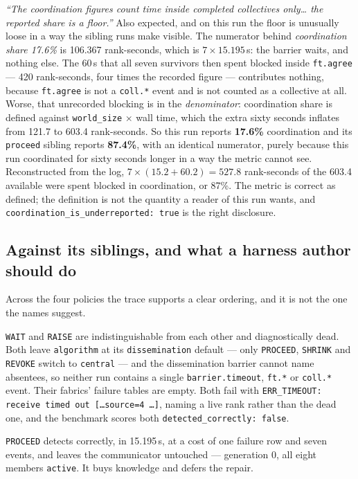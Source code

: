 \documentclass[11pt]{article}
\begin{document}
\emph{``The coordination figures count time inside \emph{completed} collectives only\ldots
the reported share is a floor.''} Also expected, and on this run the floor is unusually
loose in a way the sibling runs make visible. The numerator behind \emph{coordination
share 17.6\%} is 106.367 rank-seconds, which is $7 \times 15.195$\,s: the barrier waits,
and nothing else. The 60\,s that all seven survivors then spent blocked inside
\texttt{ft.agree} --- 420 rank-seconds, four times the recorded figure --- contributes
nothing, because \texttt{ft.agree} is not a \texttt{coll.*} event and is not counted as a
collective at all. Worse, that unrecorded blocking is in the \emph{denominator}:
coordination share is defined against \texttt{world\_size} $\times$ wall time, which the
extra sixty seconds inflates from 121.7 to 603.4 rank-seconds. So this run reports
\textbf{17.6\%} coordination and its \texttt{proceed} sibling reports \textbf{87.4\%},
with an identical numerator, purely because this run coordinated for sixty seconds longer
in a way the metric cannot see. Reconstructed from the log, $7 \times (15.2 + 60.2) =
527.8$ rank-seconds of the 603.4 available were spent blocked in coordination, or 87\%.
The metric is correct as defined; the definition is not the quantity a reader of this run
wants, and \texttt{coordination\_is\_underreported: true} is the right disclosure.

\subsection{Against its siblings, and what a harness author should do}

Across the four policies the trace supports a clear ordering, and it is not the one the
names suggest.

\texttt{WAIT} and \texttt{RAISE} are indistinguishable from each other and diagnostically
dead. Both leave \texttt{algorithm} at its \texttt{dissemination} default --- only
\texttt{PROCEED}, \texttt{SHRINK} and \texttt{REVOKE} switch to \texttt{central} --- and
the dissemination barrier cannot name absentees, so neither run contains a single
\texttt{barrier.timeout}, \texttt{ft.*} or \texttt{coll.*} event. Their fabrics' failure
tables are empty. Both fail with \texttt{ERR\_TIMEOUT: receive timed out
[\ldots source=4 \ldots]}, naming a live rank rather than the dead one, and the benchmark
scores both \texttt{detected\_correctly:\ false}.

\texttt{PROCEED} detects correctly, in 15.195\,s, at a cost of one failure row and seven
events, and leaves the communicator untouched --- generation 0, all eight members
\texttt{active}. It buys knowledge and defers the repair.
\end{document}
